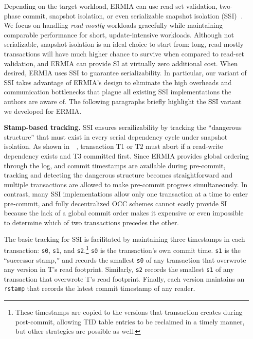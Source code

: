 Depending on the target workload, ERMIA can use read set validation, two-phase commit, snapshot isolation, or even serializable snapshot isolation (SSI)~\cite{Cahill08RF}. We focus on handling \textit{read-mostly} workloads gracefully while maintaining comparable performance for short, update-intensive workloads. Although not serializable, snapshot isolation is an ideal choice to start from: long, read-mostly transactions will have much higher chance to survive when compared to read-set validation, and ERMIA can provide SI at virtually zero additional cost. When desired, ERMIA uses SSI to guarantee serializability. In particular, our variant of SSI takes advantage of ERMIA's design to eliminate the high overheads and communication bottlenecks that plague all existing SSI implementations the authors are aware of. The following paragraphs briefly highlight the SSI variant we developed for ERMIA.


{\bf Stamp-based tracking.}
SSI ensures serailizability by tracking the ``dangerous structure'' that must exist in every serial dependency cycle under snapshot isolation. As shown in~~\cite{Cahill08RF}, transaction T1 or T2 must abort if a read-write dependency exists and T3 committed first. Since ERMIA provides global ordering through the log, and commit timestamps are available during pre-commit, tracking and detecting the dangerous structure becomes straightforward and multiple transactions are allowed to make pre-commit progress simultaneously. In contrast, many SSI implementations allow only one transaction at a time to enter pre-commit, and fully decentralized OCC schemes cannot easily provide SI because the lack of a global commit order makes it expensive or even impossible to determine which of two transactions precedes the other.

The basic tracking for SSI is facilitated by maintaining three timestamps in each transaction: \texttt{s0}, \texttt{s1}, and \texttt{s2}.\footnote{These timestamps are copied to the versions that transaction creates during post-commit, allowing TID table entries to be reclaimed in a timely manner, but other strategies are possible as well.} \texttt{s0} is the transaction's own commit time. \texttt{s1} is the ``successor stamp,'' and records the smallest \texttt{s0} of any transaction that overwrote any version in T's read footprint. Similarly, \texttt{s2} records the smallest \texttt{s1} of any transaction that overwrote T's read footprint. Finally, each version maintains an \texttt{rstamp} that records the latest commit timestamp of any reader.


